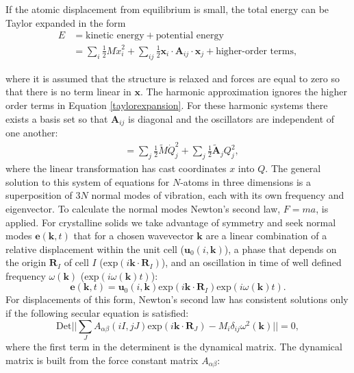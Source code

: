If the atomic displacement from equilibrium is small, the total energy can be Taylor expanded in the form\autocite{Hayes1985} 
\begin{align} \label{taylorexpansion}
E&=\textrm{kinetic energy}+\textrm{potential energy} \\
&=\sum_i\frac{1}{2}M\dot{x}_i^2+\sum_{ij}\frac{1}{2}\textbf{x}_i\cdot\textbf{A}_{ij}\cdot\textbf{x}_j+\textrm{higher-order terms},
\end{align}

where it is assumed that the structure is relaxed and forces are equal to zero so that there is no term linear in $\textbf{x}$. The harmonic approximation ignores the higher order terms in Equation \ref{taylorexpansion}. For these harmonic systems there exists a basis set so that $\textbf{A}_{ij}$ is diagonal and the oscillators are independent of one another:
\begin{align} \label{independentoscillators}
&=\sum_j\frac{1}{2}\tilde{M}\dot{Q}_j^2+\sum_{j}\frac{1}{2}\tilde{\textbf{A}}_{j}Q_j^2,
\end{align}
where the linear transformation has cast coordinates $x$ into $Q$.
The general solution to this system of equations for $N$-atoms in three dimensions is a superposition of $3N$ normal modes of vibration, each with its own frequency and eigenvector.
To calculate the normal modes Newton's second law, $F=ma$, is applied. For crystalline solids we take advantage of symmetry and seek normal modes $\textbf{e}(\textbf{k},t)$ that for a chosen wavevector $\textbf{k}$ are a linear combination of a relative displacement within the unit cell ($\textbf{u}_0(i,\textbf{k})$), a phase that depends on the origin $\textbf{R}_I$ of cell $I$ ($\textrm{exp}(i\textbf{k}\cdot \textbf{R}_I)$), and an oscillation in time of well defined frequency $\omega(\textbf{k})$ ($\textrm{exp}(i\omega(\textbf{k})t)$):
\begin{equation} \label{normalmodes}
\textbf{e}(\textbf{k},t) = \textbf{u}_0(i,\textbf{k})\textrm{exp}(i\textbf{k}\cdot\textbf{R}_I)\textrm{exp}(i\omega(\textbf{k})t).
\end{equation}
For displacements of this form, Newton's second law has consistent solutions only if the following secular equation is satisfied:
\begin{equation}
\textrm{Det}||\sum_J A_{\alpha\beta}(iI,jJ)\textrm{exp}(i\textbf{k}\cdot\textbf{R}_J)-M_i\delta_{ij}\omega^2(\textbf{k})||=0,
\end{equation}
where the first term in the determinent is the dynamical matrix. The dynamical matrix is built from the force constant matrix $A_{\alpha\beta}$:
